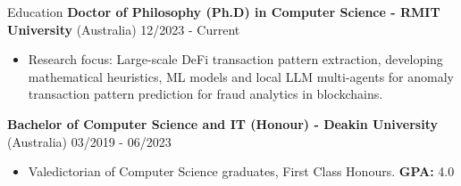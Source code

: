 \documentclass{resume}
\begin{document}
\vspace{-8pt}
\begin{rSection}{Education}
{\bf Doctor of Philosophy (Ph.D) in Computer Science - RMIT University} (Australia) \hfill {12/2023 - Current}

\vspace{-5pt}
\begin{itemize}[label=·]
    \item Research focus: Large-scale DeFi transaction pattern extraction, developing mathematical heuristics, ML models and local LLM multi-agents for anomaly transaction pattern prediction for fraud analytics in blockchains.
\end{itemize}
\vspace{-5pt}
{\bf Bachelor of Computer Science and IT (Honour) - \textbf{Deakin University}} (Australia)
\vspace{-5pt}
 \hfill {03/2019 - 06/2023}

\begin{itemize}[label=·]
    \item Valedictorian of Computer Science graduates, First Class Honours.  \hfill {\textbf{GPA:} 4.0}
    \vspace{-5pt}
\end{itemize}

\end{rSection}
\end{document}
